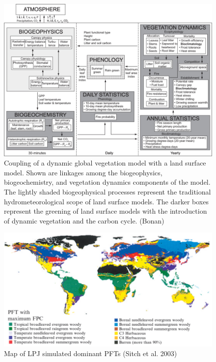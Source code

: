 \documentclass[
  12pt,
  oneside]{book}
\begin{document}
\begin{figure}

{\centering \includegraphics[width=0.8\linewidth]{figures/chap6/f64_LPJ_fllowchart} 

}

\caption{Coupling of a dynamic global vegetation model with a land surface model. Shown are linkages among the biogeophysics, biogeochemistry, and vegetation dynamics components of the model. The lightly shaded biogeophysical processes represent the traditional hydrometeorological scope of land surface models. The darker boxes represent the greening of land surface models with the introduction of dynamic vegetation and the carbon cycle. (Bonan)}\label{fig:f64}
\end{figure}

\begin{figure}

{\centering \includegraphics[width=0.8\linewidth]{figures/chap6/f65_LPJ_PFTmap} 

}

\caption{Map of LPJ simulated dominant PFTs (Sitch et al. 2003)}\label{fig:f65}
\end{figure}
\end{document}
